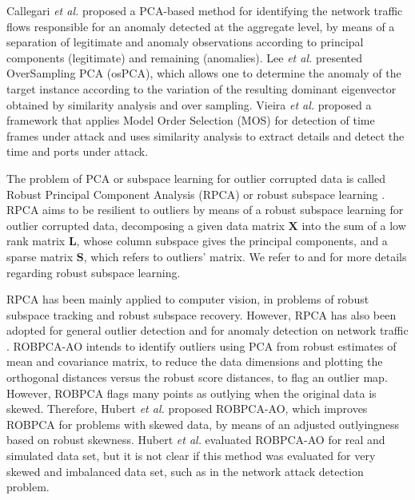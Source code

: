 \documentclass[review]{elsarticle}
\begin{document}
Callegari \emph{et al.} \cite{callegari2011novel} proposed a PCA-based method for identifying the network traffic flows responsible for an anomaly detected at the aggregate level, by means of a separation of legitimate and anomaly observations according to principal components (legitimate) and remaining (anomalies). Lee \emph{et al.} \cite{Lee2013} presented OverSampling PCA (osPCA), which allows one to determine the anomaly of the target instance according to the variation of the resulting dominant eigenvector obtained by similarity analysis and over sampling. Vieira \emph{et al.} \cite{vieira2017model} proposed a framework that applies Model Order Selection (MOS) for detection of time frames under attack and uses similarity analysis to extract details and detect the time and ports under attack.

The problem of PCA or subspace learning for outlier corrupted data is called Robust Principal Component Analysis (RPCA) or robust subspace learning \cite{candes2011robust, vaswani2018robust}. RPCA aims to be resilient to outliers by means of a robust subspace learning \cite{vaswani2018robust} for outlier corrupted data, decomposing a given data matrix $\pmb{X}$ into the sum of a low rank matrix $\pmb{L}$, whose column subspace gives the principal components, and a sparse matrix $\pmb{S}$, which refers to outliers’ matrix. We refer to \cite{lerman2018overview} and \cite{vaswani2018robust} for more details regarding robust subspace learning.

RPCA has been mainly applied to computer vision, in problems of robust subspace tracking and robust subspace recovery. However, RPCA has also been adopted for general outlier detection \cite{hubert2005robpca,hubert2009robustskewed,cherapanamjeri2017thresholding,zhou2017anomaly,NetflixSurus} and for anomaly detection on network traffic \cite{pascoal2012robust}. ROBPCA-AO \cite{hubert2005robpca} intends to identify outliers using PCA from robust estimates of mean and covariance matrix, to reduce the data dimensions and plotting the orthogonal distances versus the robust score distances, to flag an outlier map. However, ROBPCA flags many points as outlying when the original data is skewed. Therefore, Hubert \emph{et al.} \cite{hubert2009robustskewed} proposed ROBPCA-AO, which improves ROBPCA for problems with skewed data, by means of an adjusted outlyingness based on robust skewness. Hubert \emph{et al.} \cite{hubert2009robustskewed} evaluated ROBPCA-AO for real and simulated data set, but it is not clear if this method was evaluated for very skewed and imbalanced data set, such as in the network attack detection problem.
\end{document}

